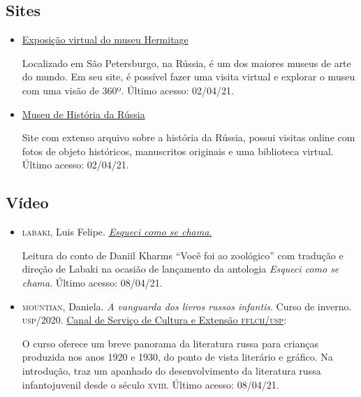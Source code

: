 \documentclass[11pt]{extarticle}
\begin{document}
\subsection{Sites}

\begin{itemize}

\item \href{https://www.hermitagemuseum.org/wps/portal/hermitage/panorama/virtual_visit/panoramas-m-1?lng=en}{Exposição virtual do museu Hermitage}

Localizado em São Petersburgo, na Rússia, é um dos maiores museus de arte do mundo. Em seu site, é possível fazer uma visita virtual e explorar o museu com uma visão de 360º. Último acesso: 02/04/21.

\item \href{https://www.russianhistorymuseum.org/}{Museu de História da Rússia}

Site com extenso arquivo sobre a história da Rússia, possui visitas online com fotos de objeto históricos, manuscritos originais e uma biblioteca virtual. Último acesso: 02/04/21.

\end{itemize}


\subsection{Vídeo}
\begin{itemize}

\item \textsc{labaki}, Luis Felipe. \href{https://www.youtube.com/watch?v=TynrL12SQ6U}{\emph{Esqueci como se chama}.}

Leitura do conto de Daniil Kharms ``Você foi ao zoológico'' com tradução e direção de Labaki na ocasião de lançamento da antologia \emph{Esqueci como se chama}. Último acesso: 08/04/21.

\item \textsc{mountian}, Daniela. \emph{A vanguarda dos livros russos infantis}. Curso
de inverno. \textsc{usp}/2020. \href{https://www.youtube.com/watch?v=2l4v9rkW6H4}{Canal de Serviço de Cultura e Extensão \textsc{fflch}/\textsc{usp}}:

O curso oferece um breve panorama da literatura russa para crianças produzida nos anos 1920 e 1930, do ponto de vista literário e gráfico. Na introdução, traz um apanhado do desenvolvimento da literatura russa infantojuvenil desde o século \textsc{xviii}. Último acesso: 08/04/21.

\end{itemize}
\end{document}
